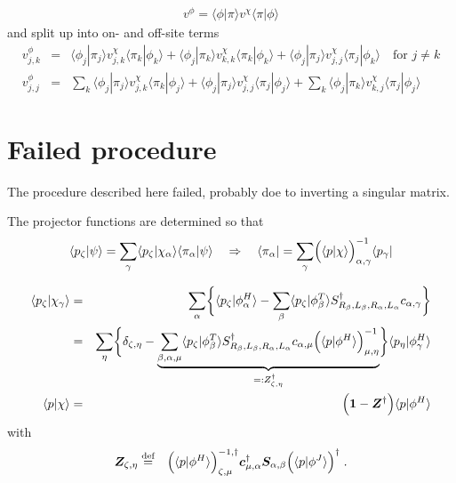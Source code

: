 \documentclass[11pt,a4paper]{report}
\begin{document}
\begin{eqnarray}
v^\phi=\langle\phi|\pi\rangle v^\chi \langle\pi|\phi\rangle
\end{eqnarray}
and split up into on- and off-site terms
\begin{eqnarray}
v^\phi_{j,k}
&=&
\langle\phi_j|\pi_j\rangle v^\chi_{j,k} \langle\pi_k|\phi_k\rangle
+\langle\phi_j|\pi_k\rangle v^\chi_{k,k} \langle\pi_k|\phi_k\rangle
+\langle\phi_j|\pi_j\rangle v^\chi_{j,j} \langle\pi_j|\phi_k\rangle
\quad\text{for $j\neq k$}
\nonumber\\
%
v^\phi_{j,j}&=&
\sum_k\langle\phi_j|\pi_j\rangle v^\chi_{j,k} \langle\pi_k|\phi_j\rangle
+\langle\phi_j|\pi_j\rangle v^\chi_{j,j} \langle\pi_j|\phi_j\rangle
+\sum_k\langle\phi_j|\pi_k\rangle v^\chi_{k,j} \langle\pi_j|\phi_j\rangle
\end{eqnarray}


\section{Failed procedure}
The procedure described here failed, probably doe to inverting a
singular matrix.

The projector functions are determined so that
\begin{eqnarray}
\langle{p}_\zeta|\psi\rangle
=
\sum_\gamma
\langle{p}_\zeta|\chi_\alpha\rangle\langle\pi_\alpha|\psi\rangle
\quad
\Rightarrow\quad
\langle\pi_\alpha|=
\sum_\gamma \Bigl(\langle{p}|\chi\rangle\Bigr)^{-1}_{\alpha,\gamma}
\langle{p}_\gamma|
\end{eqnarray}


\begin{eqnarray}
\langle{p}_\zeta|\chi_\gamma\rangle&=&
\sum_\alpha
\biggl\lbrace
\langle{p}_\zeta|\phi^H_\alpha\rangle
-
\sum_\beta 
\langle{p}_\zeta|\phi^T_{\beta}\rangle 
S^\dagger_{R_\beta,L_\beta,R_\alpha,L_\alpha}c_{\alpha,\gamma}
\biggr\rbrace 
\nonumber\\
&=&
\sum_{\eta}
\biggl\lbrace
\delta_{\zeta,\eta}
-
\underbrace{
\sum_{\beta,\alpha,\mu}
\langle{p}_\zeta|\phi^T_{\beta}\rangle S^\dagger_{R_\beta,L_\beta,R_\alpha,L_\alpha}
c_{\alpha,\mu}
\Bigl(\langle{p}|\phi^H\rangle\Bigr)^{-1}_{\mu,\eta}
}_{=:Z^\dagger_{\zeta,\eta}}
\biggr\rbrace  \langle{p}_\eta|\phi^H_\gamma\rangle 
\nonumber\\
%
\langle{p}|\chi\rangle
&=&\Bigl(\mat{1}-\mat{Z}^\dagger\Bigr)\langle{p}|\phi^H\rangle
\label{eq:localorbitalbiortho}
\end{eqnarray}
with
\begin{eqnarray}
\bm{Z}_{\zeta,\eta}&\stackrel{\text{def}}{=}&
\Bigl(\langle{p}|\phi^H\rangle\Bigr)^{-1,\dagger}_{\zeta,\mu}
\bm{c}^\dagger_{\mu,\alpha}
\bm{S}_{\alpha,\beta}
\Bigl(\langle{p}|\phi^J\rangle\Bigr)^\dagger\;.
\label{eq:zmatfromstructureconstants}
\end{eqnarray}
\end{document}
